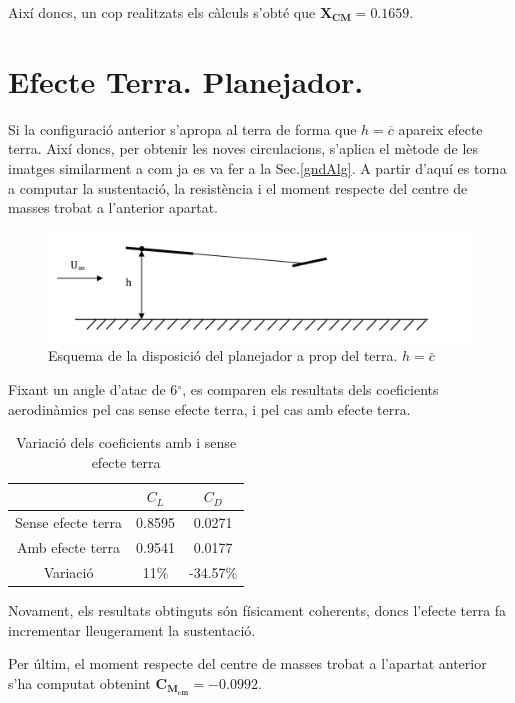 Així doncs, un cop realitzats els càlculs s'obté  que $\bm{X_{CM} = 0.1659}$.

\section{Efecte Terra. Planejador.}
Si la configuració anterior s'apropa al terra de forma que $h = \overline{c}$ apareix efecte terra. Així doncs, per obtenir les noves circulacions, s'aplica el mètode de les imatges similarment a com ja es va fer a la Sec.\ref{gndAlg}. A partir d'aquí es torna a computar la sustentació, la resistència  i el moment respecte del centre de masses trobat a l'anterior apartat.
\begin{figure}[H]
	\centering
	\includegraphics[scale=0.35]{./plots/terraGlider}
	\caption{Esquema de la disposició del planejador a prop del terra. $h=\bar{c}$}
	\label{GroundEffectGlider}
\end{figure}

Fixant un angle d'atac de 6$^{\circ}$, es comparen els resultats dels coeficients aerodinàmics pel cas sense efecte terra, i pel cas amb efecte terra.
\begin{table} [H]
	\centering
	\begin{tabular}{| c | c | c |}	
		\hline
		& $C_{L}$ & $C_{D}$  \\
		\hline
		Sense efecte terra & 0.8595 & 0.0271 \\
		\hline
		Amb efecte terra & 0.9541 & 0.0177 \\
		\hline
		Variació & 11\% & -34.57\% \\
		\hline
	\end{tabular}
\caption{Variació dels coeficients amb i sense efecte terra} \label{NoGroundvsGroundGlider}
\end{table}
Novament, els resultats obtinguts són físicament coherents, doncs l'efecte terra fa incrementar lleugerament la sustentació.

Per últim, el moment respecte del centre de masses trobat a l'apartat anterior s'ha computat obtenint $\bm{C_{M_{cm}} = -0.0992 }$.
